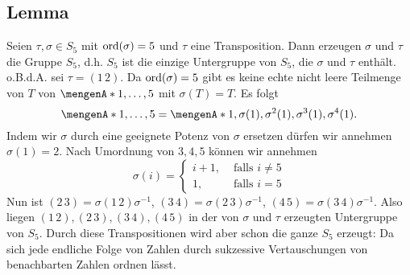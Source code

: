 \subsection[Lemma: Erzeuger von $S_5$]{Lemma} %
\label{sub:230}
Seien $\tau, \sigma \in S_5$ mit $\operatorname{ord}(\sigma)=5$ und $\tau$ eine Transposition. Dann erzeugen $\sigma$ und $\tau$ die Gruppe $S_5$, d.h. $S_5$ ist die einzige Untergruppe
von $S_5$, die $\sigma$ und $\tau$ enthält.
o.B.d.A. sei $\tau = (1 \, 2)$. Da $\operatorname{ord}(\sigma)=5$ gibt es keine echte nicht leere Teilmenge von $T$ von $\set{1,\ldots ,5} $ mit $\sigma(T)=T$. Es folgt 
\[
	\set{1,\ldots ,5} = \set{1, \sigma(1), \sigma^2(1), \sigma^3(1), \sigma^4(1)}.  
\]
Indem wir $\sigma$ durch eine geeignete Potenz von $\sigma$ ersetzen dürfen wir annehmen $\sigma(1)=2$. Nach Umordnung von $3,4,5$ können wir annehmen
\[
	\sigma(i) = \begin{cases}
		i+1, &\text{ falls }i \not= 5\\
		1 , &\text{ falls } i =5
	\end{cases}
\]
Nun ist $ (2 \, 3)= \sigma (1 \, 2) \sigma ^{-1}$, $(3 \, 4) = \sigma (2 \,3) \sigma ^{-1}$, $(4 \, 5) = \sigma (3 \, 4) \sigma ^{-1}$. Also liegen
$(1\, 2), (2 \, 3), (3 \, 4), (4 \, 5)$ in der von $\sigma$ und $\tau$ erzeugten Untergruppe von $S_5$. Durch diese Transpositionen wird aber schon die ganze $S_5$ erzeugt:
Da sich jede endliche Folge von Zahlen durch sukzessive Vertauschungen von benachbarten Zahlen ordnen lässt. \bewende

\cleardoubleoddemptypage
{}
\setcounter{page}{1}
\printindex
\listoffigures

